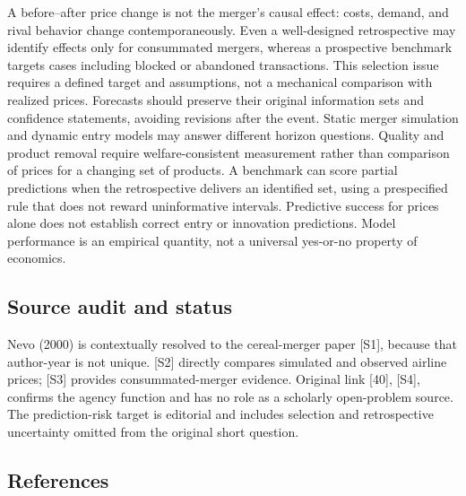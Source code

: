 \documentclass[11pt,a4paper]{article}
\begin{document}
A before--after price change is not the merger's causal effect: costs, demand, and rival behavior change contemporaneously. Even a well-designed retrospective may identify effects only for consummated mergers, whereas a prospective benchmark targets cases including blocked or abandoned transactions. This selection issue requires a defined target and assumptions, not a mechanical comparison with realized prices. Forecasts should preserve their original information sets and confidence statements, avoiding revisions after the event. Static merger simulation and dynamic entry models may answer different horizon questions. Quality and product removal require welfare-consistent measurement rather than comparison of prices for a changing set of products. A benchmark can score partial predictions when the retrospective delivers an identified set, using a prespecified rule that does not reward uninformative intervals. Predictive success for prices alone does not establish correct entry or innovation predictions. Model performance is an empirical quantity, not a universal yes-or-no property of economics.

\subsection*{Source audit and status}

Nevo (2000) is contextually resolved to the cereal-merger paper [S1], because that author-year is not unique. [S2] directly compares simulated and observed airline prices; [S3] provides consummated-merger evidence. Original link [40], [S4], confirms the agency function and has no role as a scholarly open-problem source. The prediction-risk target is editorial and includes selection and retrospective uncertainty omitted from the original short question.

\subsection*{References}
\end{document}
